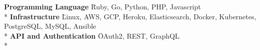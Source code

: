 
\begin{cvparagraph}

  \begin{nospacetabbing}
  \textbf{Programming Language}  \= Ruby, Go, Python, PHP, Javascript\\*
  \textbf{Infrastructure}  \= Linux, AWS, GCP, Heroku, Elasticsearch, Docker, Kubernetes, PostgreSQL, MySQL, Ansible\\*
  \textbf{API and Authentication}  \= OAuth2, REST, GraphQL\\*
  \end{nospacetabbing}

\end{cvparagraph}
